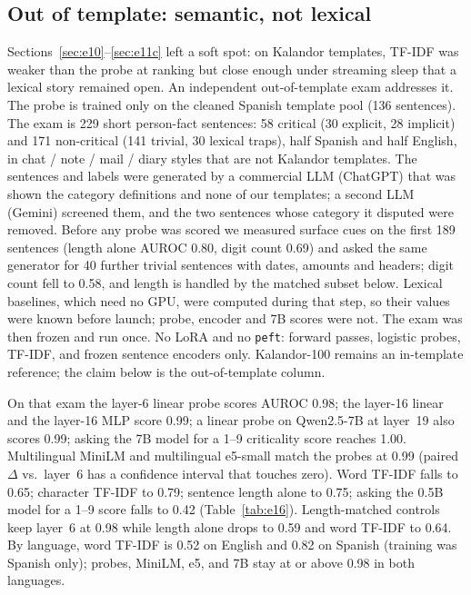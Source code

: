 \documentclass[11pt,a4paper]{article}
\begin{document}
\subsection{Out of template: semantic, not lexical}
\label{sec:e16}

Sections~\ref{sec:e10}--\ref{sec:e11c} left a soft spot: on Kalandor templates, TF-IDF was weaker than the probe at ranking but close enough under streaming sleep that a lexical story remained open.
An independent out-of-template exam addresses it.
The probe is trained only on the cleaned Spanish template pool (136 sentences).
The exam is 229 short person-fact sentences: 58 critical (30 explicit, 28 implicit) and 171 non-critical (141 trivial, 30 lexical traps), half Spanish and half English, in chat / note / mail / diary styles that are not Kalandor templates.
The sentences and labels were generated by a commercial LLM (ChatGPT) that was shown the category definitions and none of our templates; a second LLM (Gemini) screened them, and the two sentences whose category it disputed were removed.
Before any probe was scored we measured surface cues on the first 189 sentences (length alone AUROC 0.80, digit count 0.69) and asked the same generator for 40 further trivial sentences with dates, amounts and headers; digit count fell to 0.58, and length is handled by the matched subset below.
Lexical baselines, which need no GPU, were computed during that step, so their values were known before launch; probe, encoder and 7B scores were not.
The exam was then frozen and run once.
No LoRA and no \texttt{peft}: forward passes, logistic probes, TF-IDF, and frozen sentence encoders only.
Kalandor-100 remains an in-template reference; the claim below is the out-of-template column.

On that exam the layer-6 linear probe scores AUROC 0.98; the layer-16 linear and the layer-16 MLP score 0.99; a linear probe on Qwen2.5-7B at layer~19 also scores 0.99; asking the 7B model for a 1--9 criticality score reaches 1.00.
Multilingual MiniLM and multilingual e5-small match the probes at 0.99 (paired $\Delta$ vs.\ layer~6 has a confidence interval that touches zero).
Word TF-IDF falls to 0.65; character TF-IDF to 0.79; sentence length alone to 0.75; asking the 0.5B model for a 1--9 score falls to 0.42 (Table~\ref{tab:e16}).
Length-matched controls keep layer~6 at 0.98 while length alone drops to 0.59 and word TF-IDF to 0.64.
By language, word TF-IDF is 0.52 on English and 0.82 on Spanish (training was Spanish only); probes, MiniLM, e5, and 7B stay at or above 0.98 in both languages.
\end{document}
